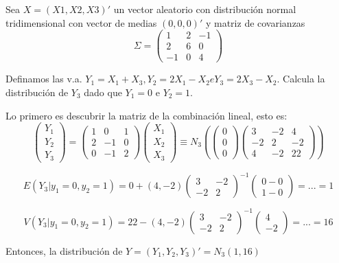 \begin{problem}[7]
Sea $X = (X1,X2,X3)'$ un vector aleatorio con distribución normal tridimensional con vector de medias $(0,0,0)'$ y matriz de covarianzas
\[
Σ =
\begin{pmatrix}
1&2&−1\\
2&6&0\\
−1&0&4
\end{pmatrix}
\]


Definamos las v.a. $Y_1 = X_1 + X_3, Y_2 = 2X_1 − X_2 e Y_3 = 2X_3 − X_2$. Calcula la distribución de $Y_3$ dado que $Y_1=0$ e $Y_2=1$.

\solution

Lo primero es descubrir la matriz de la combinación lineal, esto es:
\[
\begin{pmatrix} Y_1\\Y_2\\Y_3\end{pmatrix} = \begin{pmatrix}1&0&1\\2&-1&0\\0&-1&2\end{pmatrix}\begin{pmatrix}X_1\\X_2\\X_3\end{pmatrix} \equiv N_3 \left( \begin{pmatrix}0\\0\\0\end{pmatrix} \begin{pmatrix}3&-2&4\\-2&2&-2\\4&-2&22 \end{pmatrix} \right)

 \]

\[
E(Y_3|y_1 = 0, y_2 = 1) = 0 + (4,-2) \begin{pmatrix} 3&-2\\-2&2\end{pmatrix}^{-1} \begin{pmatrix}0-0\\1-0\end{pmatrix} = ... = 1
\]

\[
V(Y_3|y_1=0,y_2=1) = 22 - (4,-2) \begin{pmatrix} 3&-2\\-2&2 \end{pmatrix}^{-1} \begin{pmatrix}4\\-2\end{pmatrix} = ... = 16
\]


Entonces, la distribución de $Y = (Y_1,Y_2,Y_3)' = N_3(1,16)$

\end{problem}
